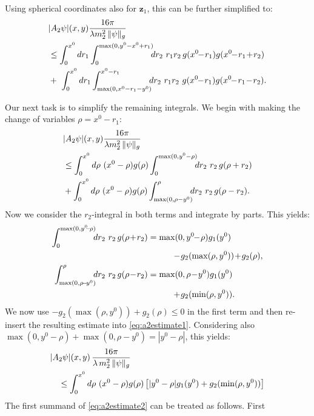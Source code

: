 \documentclass[b5paper,draft,openbib,12pt]{memoir}
\newcommand{\vz}{\mathbf{z}}
\begin{document}
Using spherical coordinates also for $\vz_1$, this can be further simplified 
to:
\begin{align}
  &|A_2 \psi|(x,y)  \frac{16\pi}{\lambda  m_2^2 \, \| \psi \|_g} \notag\\
  &\leq  \int_0^{x^0} d r_1 \int_0^{\max(0,y^0-x^0+r_1)} \!\!\! dr_2~r_1 r_2\,g(x^0\!\!-\!r_1) g(x^0\!\!-\!r_1\!+\!r_2)\label{eq:A2firstestimate}\\
&+~\int_0^{x^0} d r_1 \int_{\max( 0,x^0-r_1-y^0)}^{x^0-r_1} \!\!\! dr_2~r_1 r_2 ~ g(x^0\!\!-\!r_1) g(x^0\!\!-\!r_1\!-\!r_2) \label{eq:A2secondestimate}.
\end{align}

Our next task is to simplify the remaining integrals. We begin with making 
the change of variables $\rho = x^0-r_1$:
\begin{align}
  &|A_2 \psi|(x,y)  \frac{16\pi}{\lambda  m_2^2 \, \| \psi \|_g} \notag\\
&\leq  \int_0^{x^0} d \rho~(x^0-\rho) g(\rho) \int_0^{\max(0,y^0-\rho)} \!\!\! dr_2~r_2\, g(\rho+r_2)\nonumber\\
&+\int_0^{x^0} d \rho~(x^0-\rho)g(\rho) \int_{\max( 0,\rho-y^0)}^{\rho} \!\!\! dr_2~r_2 \, g(\rho-r_2).
\label{eq:a2estimate1}
\end{align}
Now we consider the $r_2$-integral in both terms and integrate by parts. 
This yields:
\begin{align}
   \int_0^{\max(0,y^0\!\!-\!\rho)} \!\!\! dr_2~r_2\, g(\rho\!+\!r_2)
   &=\max(0,y^0\!\!-\!\rho) g_1(y^0) \notag\\
   &\quad \quad \quad \!-\! g_2(\max(\rho,y^0)) \!+\! g_2(\rho),\\
\int_{\max( 0,\rho\!-\!y^0)}^{\rho} \!\!\! dr_2~r_2 \, g(\rho\!-\!r_2) \notag
&= \max( 0,\rho\!-\!y^0) g_1(y^0) \\
&\quad\quad  \quad \!+\! g_2(\min(\rho,y^0)).
\end{align}
We now use $- g_2(\max(\rho,y^0)) + g_2(\rho) \leq 0$ in the first term and 
then re-insert the resulting estimate into \eqref{eq:a2estimate1}. 
Considering also $\max(0,y^0-\rho) + \max( 0,\rho-y^0) = |y^0-\rho|$, this 
yields:
\begin{align}
  &|A_2 \psi|(x,y) \, \frac{16\pi}{\lambda \, m_2^2 \, \| \psi \|_g}\notag\\
  &\quad \leq  \int_0^{x^0} d \rho~(x^0-\rho) g(\rho) \left[|y^0-\rho| g_1(y^0) + g_2(\min(\rho,y^0)) \right]
\label{eq:a2estimate2}
\end{align}
The first summand of \eqref{eq:a2estimate2} can be treated as follows. First 
\end{document}
